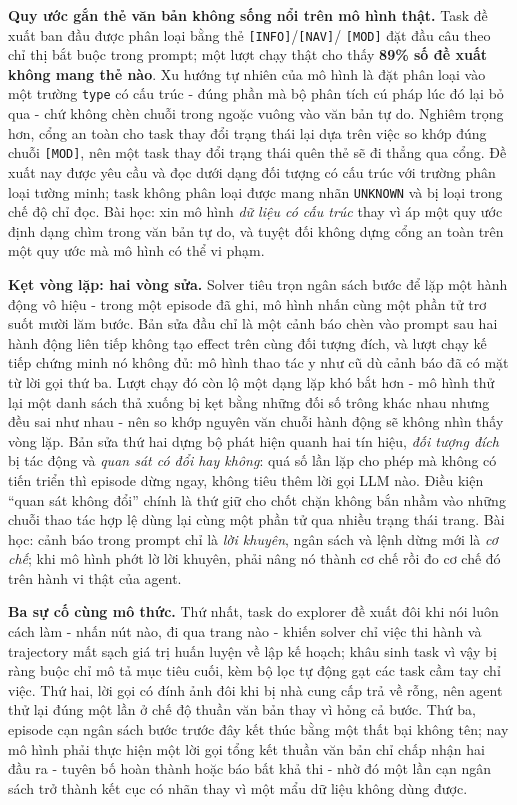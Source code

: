 \textbf{Quy ước gắn thẻ văn bản không sống nổi trên mô hình thật.} Task đề xuất
ban đầu được phân loại bằng thẻ \texttt{[INFO]}\slash\texttt{[NAV]}\slash%
\texttt{[MOD]} đặt đầu câu theo chỉ thị bắt buộc trong prompt; một lượt chạy
thật cho thấy \textbf{89\% số đề xuất không mang thẻ nào}. Xu hướng tự nhiên
của mô hình là đặt phân loại vào một trường \texttt{type} có cấu trúc - đúng
phần mà bộ phân tích cú pháp lúc đó lại bỏ qua - chứ không chèn chuỗi trong
ngoặc vuông vào văn bản tự do. Nghiêm trọng hơn, cổng an toàn cho task thay đổi
trạng thái lại dựa trên việc so khớp đúng chuỗi \texttt{[MOD]}, nên một task
thay đổi trạng thái quên thẻ sẽ đi thẳng qua cổng. Đề xuất nay được yêu cầu và
đọc dưới dạng đối tượng có cấu trúc với trường phân loại tường minh; task không
phân loại được mang nhãn \texttt{UNKNOWN} và bị loại trong chế độ chỉ đọc. Bài
học: xin mô hình \emph{dữ liệu có cấu trúc} thay vì áp một quy ước định dạng
chìm trong văn bản tự do, và tuyệt đối không dựng cổng an toàn trên một quy ước
mà mô hình có thể vi phạm.

\textbf{Kẹt vòng lặp: hai vòng sửa.} Solver tiêu trọn ngân sách bước để lặp một
hành động vô hiệu - trong một episode đã ghi, mô hình nhấn cùng một phần tử trơ
suốt mười lăm bước. Bản sửa đầu chỉ là một cảnh báo chèn vào prompt sau hai
hành động liên tiếp không tạo effect trên cùng đối tượng đích, và lượt chạy kế
tiếp chứng minh nó không đủ: mô hình thao tác y như cũ dù cảnh báo đã có mặt từ
lời gọi thứ ba. Lượt chạy đó còn lộ một dạng lặp khó bắt hơn - mô hình thử lại
một danh sách thả xuống bị kẹt bằng những đối số trông khác nhau nhưng đều sai
như nhau - nên so khớp nguyên văn chuỗi hành động sẽ không nhìn thấy vòng lặp.
Bản sửa thứ hai dựng bộ phát hiện quanh hai tín hiệu, \emph{đối tượng đích} bị
tác động và \emph{quan sát có đổi hay không}: quá số lần lặp cho phép mà không
có tiến triển thì episode dừng ngay, không tiêu thêm lời gọi LLM nào. Điều kiện
``quan sát không đổi'' chính là thứ giữ cho chốt chặn không bắn nhầm vào những
chuỗi thao tác hợp lệ dùng lại cùng một phần tử qua nhiều trạng thái trang. Bài
học: cảnh báo trong prompt chỉ là \emph{lời khuyên}, ngân sách và lệnh dừng mới
là \emph{cơ chế}; khi mô hình phớt lờ lời khuyên, phải nâng nó thành cơ chế rồi
đo cơ chế đó trên hành vi thật của agent.

\textbf{Ba sự cố cùng mô thức.} Thứ nhất, task do explorer đề xuất đôi khi nói
luôn cách làm - nhấn nút nào, đi qua trang nào - khiến solver chỉ việc thi hành
và trajectory mất sạch giá trị huấn luyện về lập kế hoạch; khâu sinh task vì
vậy bị ràng buộc chỉ mô tả mục tiêu cuối, kèm bộ lọc tự động gạt các task cầm
tay chỉ việc. Thứ hai, lời gọi có đính ảnh đôi khi bị nhà cung cấp trả về rỗng,
nên agent thử lại đúng một lần ở chế độ thuần văn bản thay vì hỏng cả bước. Thứ
ba, episode cạn ngân sách bước trước đây kết thúc bằng một thất bại không tên;
nay mô hình phải thực hiện một lời gọi tổng kết thuần văn bản chỉ chấp nhận hai
đầu ra - tuyên bố hoàn thành hoặc báo bất khả thi - nhờ đó một lần cạn ngân
sách trở thành kết cục có nhãn thay vì một mẩu dữ liệu không dùng được.

